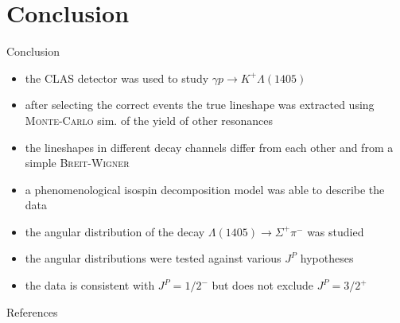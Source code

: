 \documentclass[11pt,aspectratio=1610,dvipsnames]{beamer}
\begin{document}
\section{Conclusion}
\begin{frame}{Conclusion}
\begin{minipage}{.49\linewidth}
	\begin{tcolorbox}[colback=black!10,colframe=gray!20!black,title=Lineshape measurement] 
	\begin{itemize}
		\item the CLAS detector was used to study $\gamma p \to K^+\Lambda(1405)$
		\item after selecting the correct events the true lineshape was extracted using \textsc{Monte-Carlo} sim. of the yield of other resonances
		\item the lineshapes in different decay channels differ from each other and from a simple \textsc{Breit-Wigner}
		\item a phenomenological isospin decomposition model was able to describe the data
	\end{itemize}

\end{tcolorbox}
\end{minipage}
\begin{minipage}{.49\linewidth}
	\begin{tcolorbox}[colback=black!10,colframe=gray!20!black,title=Spin parity measurement] 
		\begin{itemize}
			\item the angular distribution of the decay $\Lambda(1405)\to\Sigma^+\pi^-$ was studied
			\item the angular distributions were tested against various $J^P$ hypotheses
			\item the data is consistent with $J^P=1/2^-$ but does not exclude $J^P=3/2^+$
		\end{itemize}
		
	\end{tcolorbox}
\end{minipage}	
\end{frame}





\begin{frame}{References}
	\printbibliography
\end{frame}
\end{document}

